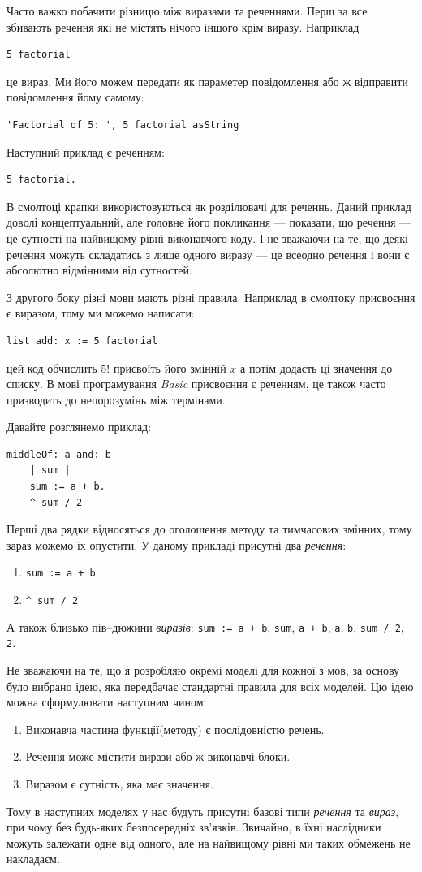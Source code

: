 \documentclass[12pt,a4paper]{article}
\begin{document}
Часто важко побачити різницю між виразами та реченнями. Перш за все збивають речення які не містять нічого іншого крім виразу. Наприклад
\begin{lstlisting}[language=Smalltalk]
5 factorial
\end{lstlisting}
це вираз. Ми його можем передати як параметер повідомлення або ж відправити повідомлення йому самому:
\begin{lstlisting}[language=Smalltalk]
'Factorial of 5: ', 5 factorial asString
\end{lstlisting}
Наступний приклад є реченням:
\begin{lstlisting}[language=Smalltalk]
5 factorial.
\end{lstlisting}
В смолтоці крапки використовуються як розділювачі для реченнь. Даний приклад доволі концептуальний, але головне його покликання --- показати, що речення --- це сутності на найвищому рівні виконавчого коду. І не зважаючи на те, що деякі речення можуть складатись з лише одного виразу --- це всеодно речення і вони є абсолютно відмінними від сутностей.

З другого боку різні мови мають різні правила. Наприклад в смолтоку присвоєння є виразом, тому ми можемо написати:
\begin{lstlisting}[language=Smalltalk]
list add: x := 5 factorial
\end{lstlisting}
цей код обчислить $5!$ присвоїть його змінній $x$ а потім додасть ці значення до списку. В мові програмування \emph{Basic} присвоєння є реченням, це також часто призводить до непорозумінь між термінами.

Давайте розглянемо приклад:
\begin{lstlisting}[language=Smalltalk]
middleOf: a and: b
    | sum |
    sum := a + b.
    ^ sum / 2
\end{lstlisting}
Перші два рядки відносяться до оголошення методу та тимчасових змінних, тому зараз можемо їх опустити. У даному прикладі присутні два \emph{речення}:
\begin{enumerate}
	\item \lstinline$sum := a + b$
	\item \lstinline$^ sum / 2$
\end{enumerate}
А також близько пів--дюжини \emph{виразів}: \lstinline$sum := a + b$, \lstinline$sum$, \lstinline$a + b$, \lstinline$a$, \lstinline$b$, \lstinline$sum / 2$, \lstinline$2$.

Не зважаючи на те, що я розробляю окремі моделі для кожної з мов, за основу було вибрано ідею, яка передбачає стандартні правила для всіх моделей. Цю ідею можна сформулювати наступним чином:
\begin{enumerate}
  \item Виконавча частина функції(методу) є послідовністю речень.
  \item Речення може містити вирази або ж виконавчі блоки.
  \item Виразом є сутність, яка має значення.
\end{enumerate}
Тому в наступних моделях у нас будуть присутні базові типи \emph{речення} та \emph{вираз}, при чому без будь-яких безпосередніх зв'язків. Звичайно, в їхні наслідники можуть залежати одне від одного, але на найвищому рівні ми таких обмежень не накладаєм.
\end{document}
